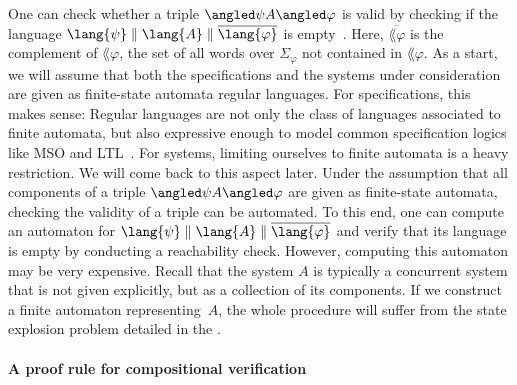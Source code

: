 \documentclass[../../diss.tex]{subfiles}
\begin{document}
One can check whether a triple $\agtriple{\psi}{A}{\varphi}$ is valid by checking if the language $\lang{\psi} \parcomp \lang{A} \parcomp \overline{\lang{\varphi}}$ is empty~\cite{PasareanuGBCB08}.
Here, $\overline{\lang{\varphi}}$ is the complement of $\lang{\varphi}$, \ie the set of all words over $\Sigma_\varphi$ not contained in $\lang{\varphi}$.
As a start, we will assume that both the specifications and the systems under consideration are given as finite-state automata \resp regular languages.
For specifications, this makes sense: Regular languages are not only the class of languages associated to finite automata, but also expressive enough to model common specification logics like MSO and LTL~\cite{Pnueli77}.
For systems, limiting ourselves to finite automata is a heavy restriction.
We will come back to this aspect later.
%
Under the assumption that all components of a triple $\agtriple{\psi}{A}{\varphi}$ are given as finite-state automata, checking the validity of a triple can be automated.
To this end, one can compute an automaton for $\lang{\psi} \parcomp \lang{A} \parcomp \overline{\lang{\varphi}}$ and verify that its language is empty by conducting a reachability check.
However, computing this automaton may be very expensive.
Recall that the system $A$ is typically a concurrent system that is not given explicitly, but as a collection of its components.
If we construct a finite automaton representing~$A$, the whole procedure will suffer from the state explosion problem detailed in the .

\paragraph{A proof rule for compositional verification}
\end{document}
